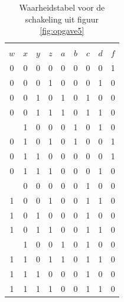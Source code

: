 \documentclass[a4paper,12pt,addpoints,fleqn,dutch,concept]{tisdexam}
\begin{document}
\begin{questions}
\begin{table}[H]
  \caption{Waarheidstabel voor de schakeling uit figuur \ref{fig:opgave5}}
  \label{tab:ant_opgave5b}
    \begin{tabular}{ c c c c | c c c c | c }
      \hline
            &         &         &         &         &         &         &         &       \\ [-2.9ex]
      $w$   &   $x$   &   $y$   &   $z$   &   $a$   &   $b$   &   $c$   &   $d$   & $f$   \\ \hline
       0    &    0    &    0    &    0    &    0    &    0    &    0    &    0    &  1    \\
       0    &    0    &    0    &    1    &    0    &    0    &    0    &    1    &  0    \\
       0    &    0    &    1    &    0    &    1    &    0    &    1    &    0    &  0    \\
       0    &    0    &    1    &    1    &    1    &    0    &    1    &    1    &  0    \\ \hdashline
       0    &    1    &    0    &    0    &    0    &    1    &    0    &    1    &  0    \\
       0    &    1    &    0    &    1    &    0    &    1    &    0    &    0    &  1    \\
       0    &    1    &    1    &    0    &    0    &    0    &    0    &    0    &  1    \\ 
       0    &    1    &    1    &    1    &    0    &    0    &    0    &    1    &  0    \\ \hdashline
       1    &    0    &    0    &    0    &    0    &    0    &    1    &    0    &  0    \\
       1    &    0    &    0    &    1    &    0    &    0    &    1    &    1    &  0    \\
       1    &    0    &    1    &    0    &    0    &    0    &    1    &    0    &  0    \\
       1    &    0    &    1    &    1    &    0    &    0    &    1    &    1    &  0    \\ \hdashline
       1    &    1    &    0    &    0    &    1    &    0    &    1    &    0    &  0    \\
       1    &    1    &    0    &    1    &    1    &    0    &    1    &    1    &  0    \\
       1    &    1    &    1    &    0    &    0    &    0    &    1    &    0    &  0    \\ 
       1    &    1    &    1    &    1    &    0    &    0    &    1    &    1    &  0    \\ \hline
    \end{tabular}
\end{table}


\end{questions}
\end{document}
